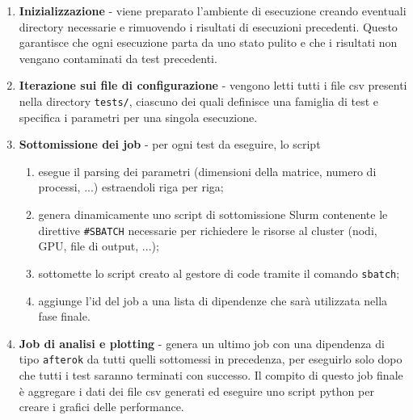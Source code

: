 \begin{enumerate}
    \item \textbf{Inizializzazione} - viene preparato l'ambiente di esecuzione creando eventuali directory necessarie e rimuovendo i risultati di esecuzioni precedenti. Questo garantisce che ogni esecuzione parta da uno stato pulito e che i risultati non vengano contaminati da test precedenti.

    \item \textbf{Iterazione sui file di configurazione} - vengono letti tutti i file csv presenti nella directory \texttt{tests/}, ciascuno dei quali definisce una famiglia di test e specifica i parametri per una singola esecuzione.

    \item \textbf{Sottomissione dei job} - per ogni test da eseguire, lo script
          \begin{enumerate}
              \item esegue il parsing dei parametri (dimensioni della matrice, numero di processi, ...) estraendoli riga per riga;
              \item genera dinamicamente uno script di sottomissione Slurm contenente le direttive \texttt{\#SBATCH} necessarie per richiedere le risorse al cluster (nodi, GPU, file di output, ...);
              \item sottomette lo script creato al gestore di code tramite il comando \texttt{sbatch};
              \item aggiunge l'id del job a una lista di dipendenze che sarà utilizzata nella fase finale.
          \end{enumerate}

    \item \textbf{Job di analisi e plotting} - genera un ultimo job con una dipendenza di tipo \texttt{afterok} da tutti quelli sottomessi in precedenza, per eseguirlo solo dopo che tutti i test saranno terminati con successo. Il compito di questo job finale è aggregare i dati dei file csv generati ed eseguire uno script python per creare i grafici delle performance.
\end{enumerate}

